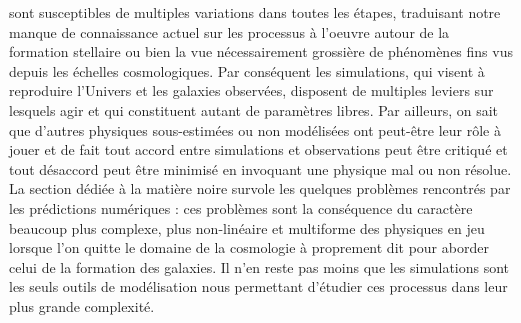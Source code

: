  sont susceptibles de multiples variations dans toutes les étapes, traduisant notre manque de connaissance actuel sur les processus à l'oeuvre autour de la formation stellaire ou bien la vue nécessairement grossière de phénomènes fins vus depuis les échelles cosmologiques. Par conséquent les simulations, qui visent à reproduire l'Univers et les galaxies observées, disposent de multiples leviers sur lesquels agir et qui constituent autant de paramètres libres. Par ailleurs, on sait que d'autres physiques sous-estimées ou non modélisées ont peut-être leur rôle à jouer et de fait tout accord entre simulations et observations peut être critiqué et tout désaccord peut être minimisé en invoquant une physique mal ou non résolue. La section dédiée à la matière noire survole les quelques problèmes rencontrés par les prédictions numériques : ces problèmes sont la conséquence du caractère beaucoup plus complexe, plus non-linéaire et multiforme des physiques en jeu lorsque l'on quitte le domaine de la cosmologie à proprement dit pour aborder celui de la formation des galaxies. Il n'en reste pas moins que les simulations sont les seuls outils de modélisation nous permettant d'étudier ces processus dans leur plus grande complexité.
